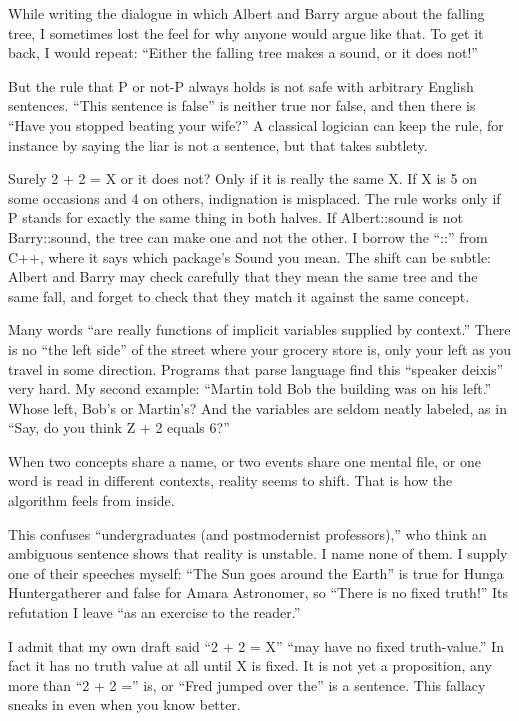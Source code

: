 
While writing the dialogue in which Albert and Barry argue about the falling tree, I sometimes lost the feel for why anyone would argue like that. To get it back, I would repeat: ``Either the falling tree makes a sound, or it does not!''

But the rule that P or not-P always holds is not safe with arbitrary English sentences. ``This sentence is false'' is neither true nor false, and then there is ``Have you stopped beating your wife?'' A classical logician can keep the rule, for instance by saying the liar is not a sentence, but that takes subtlety.

Surely 2 + 2 = X or it does not? Only if it is really the same X. If X is 5 on some occasions and 4 on others, indignation is misplaced. The rule works only if P stands for exactly the same thing in both halves. If Albert::sound is not Barry::sound, the tree can make one and not the other. I borrow the ``::'' from C++, where it says which package's Sound you mean. The shift can be subtle: Albert and Barry may check carefully that they mean the same tree and the same fall, and forget to check that they match it against the same concept. 

Many words ``are really functions of implicit variables supplied by context.'' There is no ``the left side'' of the street where your grocery store is, only your left as you travel in some direction. Programs that parse language find this ``speaker deixis'' very hard. My second example: ``Martin told Bob the building was on his left.'' Whose left, Bob's or Martin's? And the variables are seldom neatly labeled, as in ``Say, do you think Z + 2 equals 6?'' 

When two concepts share a name, or two events share one mental file, or one word is read in different contexts, reality seems to shift. That is how the algorithm feels from inside. 

This confuses ``undergraduates (and postmodernist professors),'' who think an ambiguous sentence shows that reality is unstable. I name none of them. I supply one of their speeches myself: ``The Sun goes around the Earth'' is true for Hunga Huntergatherer and false for Amara Astronomer, so ``There is no fixed truth!'' Its refutation I leave ``as an exercise to the reader.''

I admit that my own draft said ``2 + 2 = X'' ``may have no fixed truth-value.'' In fact it has no truth value at all until X is fixed. It is not yet a proposition, any more than ``2 + 2 ='' is, or ``Fred jumped over the'' is a sentence. This fallacy sneaks in even when you know better.
